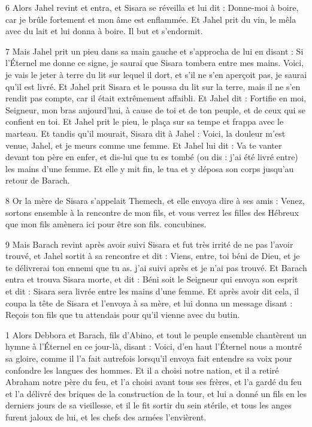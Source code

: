 \par 6 Alors Jahel revint et entra, et Sisara se réveilla et lui dit : Donne-moi à boire, car je brûle fortement et mon âme est enflammée. Et Jahel prit du vin, le mêla avec du lait et lui donna à boire. Il but et s'endormit.

\par 7 Mais Jahel prit un pieu dans sa main gauche et s'approcha de lui en disant : Si l'Éternel me donne ce signe, je saurai que Sisara tombera entre mes mains. Voici, je vais le jeter à terre du lit sur lequel il dort, et s'il ne s'en aperçoit pas, je saurai qu'il est livré. Et Jahel prit Sisara et le poussa du lit sur la terre, mais il ne s'en rendit pas compte, car il était extrêmement affaibli. Et Jahel dit : Fortifie en moi, Seigneur, mon bras aujourd'hui, à cause de toi et de ton peuple, et de ceux qui se confient en toi. Et Jahel prit le pieu, le plaça sur sa tempe et frappa avec le marteau. Et tandis qu'il mourait, Sisara dit à Jahel : Voici, la douleur m'est venue, Jahel, et je meurs comme une femme. Et Jahel lui dit : Va te vanter devant ton père en enfer, et dis-lui que tu es tombé (ou dis : j'ai été livré entre) les mains d'une femme. Et elle y mit fin, le tua et y déposa son corps jusqu'au retour de Barach.

\par 8 Or la mère de Sisara s'appelait Themech, et elle envoya dire à ses amis : Venez, sortons ensemble à la rencontre de mon fils, et vous verrez les filles des Hébreux que mon fils amènera ici pour être son fils. concubines.

\par 9 Mais Barach revint après avoir suivi Sisara et fut très irrité de ne pas l'avoir trouvé, et Jahel sortit à sa rencontre et dit : Viens, entre, toi béni de Dieu, et je te délivrerai ton ennemi que tu as. j'ai suivi après et je n'ai pas trouvé. Et Barach entra et trouva Sisara morte, et dit : Béni soit le Seigneur qui envoya son esprit et dit : Sisara sera livrée entre les mains d'une femme. Et après avoir dit cela, il coupa la tête de Sisara et l'envoya à sa mère, et lui donna un message disant : Reçois ton fils que tu attendais pour qu'il vienne avec du butin.




\par 1 Alors Debbora et Barach, fils d'Abino, et tout le peuple ensemble chantèrent un hymne à l'Éternel en ce jour-là, disant : Voici, d'en haut l'Éternel nous a montré sa gloire, comme il l'a fait autrefois lorsqu'il envoya fait entendre sa voix pour confondre les langues des hommes. Et il a choisi notre nation, et il a retiré Abraham notre père du feu, et l'a choisi avant tous ses frères, et l'a gardé du feu et l'a délivré des briques de la construction de la tour, et lui a donné un fils en les derniers jours de sa vieillesse, et il le fit sortir du sein stérile, et tous les anges furent jaloux de lui, et les chefs des armées l'envièrent.

